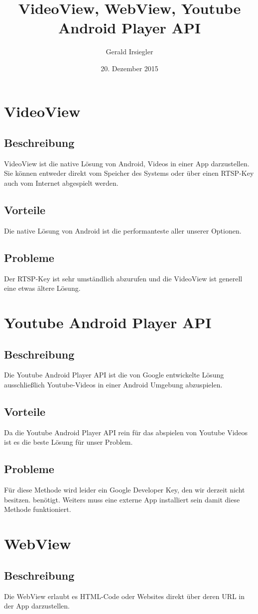 \documentclass[article,10pt]{scrartcl}
\title{VideoView, WebView, Youtube Android Player API}
\author{Gerald Irsiegler}
\date{20. Dezember 2015}
\begin{document}
\section{VideoView}
\subsection{Beschreibung}
VideoView ist die native Lösung von Android, Videos in einer App darzustellen. Sie können entweder direkt vom Speicher des Systems oder über einen RTSP-Key auch vom Internet  abgespielt werden.
\subsection{Vorteile}
Die native Lösung von Android ist die performanteste aller unserer Optionen.
\subsection{Probleme}
Der RTSP-Key ist sehr umständlich abzurufen und die VideoView ist generell eine etwas ältere Lösung.

\section{Youtube Android Player API}
\subsection{Beschreibung}
Die Youtube Android Player API ist die von Google entwickelte Lösung ausschließlich Youtube-Videos in einer Android Umgebung abzuspielen.
\subsection{Vorteile}
Da die Youtube Android Player API rein für das abspielen von Youtube Videos ist es die beste Lösung für unser Problem.
\subsection{Probleme}
Für diese Methode wird leider ein Google Developer Key, den wir derzeit nicht besitzen. benötigt. Weiters muss eine externe App installiert sein damit diese Methode funktioniert.
\newpage

\section{WebView}
\subsection{Beschreibung}
Die WebView erlaubt es HTML-Code oder Websites direkt über deren URL in der App darzustellen.
\end{document}
